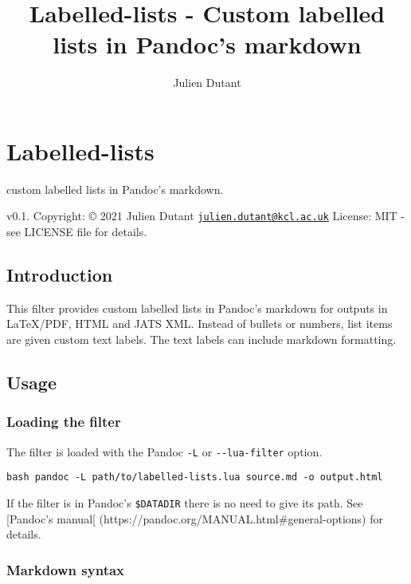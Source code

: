 \documentclass[
]{article}
\title{Labelled-lists - Custom labelled lists in Pandoc's markdown}
\author{Julien Dutant}
\date{}
\begin{document}
\maketitle

\hypertarget{labelled-lists}{%
\section{Labelled-lists}\label{labelled-lists}}

custom labelled lists in Pandoc's markdown.

v0.1. Copyright: © 2021 Julien Dutant
\href{mailto:julien.dutant@kcl.ac.uk}{\nolinkurl{julien.dutant@kcl.ac.uk}}
License: MIT - see LICENSE file for details.

\hypertarget{introduction}{%
\subsection{Introduction}\label{introduction}}

This filter provides custom labelled lists in Pandoc's markdown for
outputs in LaTeX/PDF, HTML and JATS XML. Instead of bullets or numbers,
list items are given custom text labels. The text labels can include
markdown formatting.

\hypertarget{usage}{%
\subsection{Usage}\label{usage}}

\hypertarget{loading-the-filter}{%
\subsubsection{Loading the filter}\label{loading-the-filter}}

The filter is loaded with the Pandoc \texttt{-L} or
\texttt{-\/-lua-filter} option.

\texttt{bash\ pandoc\ -L\ path/to/labelled-lists.lua\ source.md\ -o\ output.html}

If the filter is in Pandoc's \texttt{\$DATADIR} there is no need to give
its path. See {[}Pandoc's manual{[}
(https://pandoc.org/MANUAL.html\#general-options) for details.

\hypertarget{markdown-syntax}{%
\subsubsection{Markdown syntax}\label{markdown-syntax}}
\end{document}
